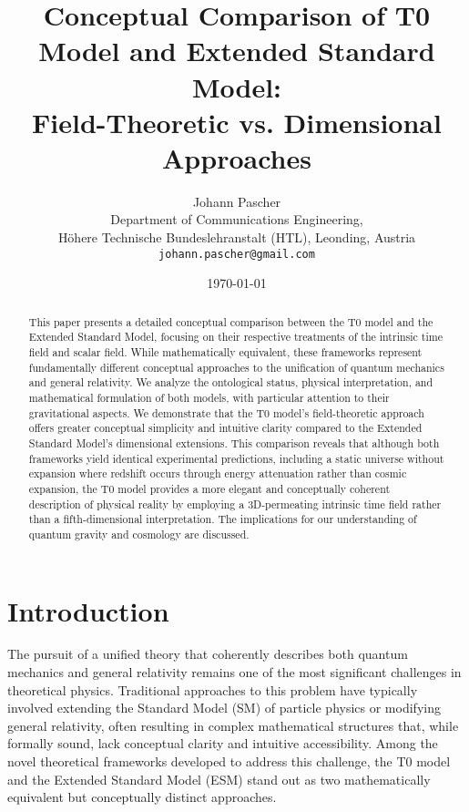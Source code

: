 \documentclass[12pt,a4paper]{article}
\begin{document}
	
	\title{Conceptual Comparison of T0 Model and Extended Standard Model: \\Field-Theoretic vs. Dimensional Approaches}
	\author{Johann Pascher\\
		Department of Communications Engineering, \\Höhere Technische Bundeslehranstalt (HTL), Leonding, Austria\\
		\texttt{johann.pascher@gmail.com}}
	\date{\today}
	
	\maketitle
	
	\begin{abstract}
		This paper presents a detailed conceptual comparison between the T0 model and the Extended Standard Model, focusing on their respective treatments of the intrinsic time field and scalar field. While mathematically equivalent, these frameworks represent fundamentally different conceptual approaches to the unification of quantum mechanics and general relativity. We analyze the ontological status, physical interpretation, and mathematical formulation of both models, with particular attention to their gravitational aspects. We demonstrate that the T0 model's field-theoretic approach offers greater conceptual simplicity and intuitive clarity compared to the Extended Standard Model's dimensional extensions. This comparison reveals that although both frameworks yield identical experimental predictions, including a static universe without expansion where redshift occurs through energy attenuation rather than cosmic expansion, the T0 model provides a more elegant and conceptually coherent description of physical reality by employing a 3D-permeating intrinsic time field rather than a fifth-dimensional interpretation. The implications for our understanding of quantum gravity and cosmology are discussed.
	\end{abstract}
	\newpage
	\tableofcontents
	\newpage
	\section{Introduction}
	\label{sec:introduction}
	
	The pursuit of a unified theory that coherently describes both quantum mechanics and general relativity remains one of the most significant challenges in theoretical physics. Traditional approaches to this problem have typically involved extending the Standard Model (SM) of particle physics or modifying general relativity, often resulting in complex mathematical structures that, while formally sound, lack conceptual clarity and intuitive accessibility. Among the novel theoretical frameworks developed to address this challenge, the T0 model and the Extended Standard Model (ESM) stand out as two mathematically equivalent but conceptually distinct approaches.
	
\end{document}
